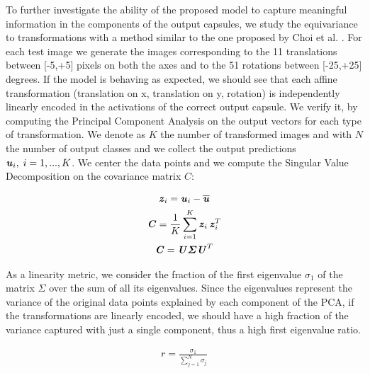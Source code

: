 \documentclass{article}
\begin{document}
To further investigate the ability of the proposed model to capture meaningful information in the components of the output capsules, we study the equivariance to transformations with a method similar to the one proposed by Choi et al. \cite{choi2019attention}. For each test image we generate the images corresponding to the 11 translations between [-5,+5] pixels on both the axes and to the 51 rotations between [-25,+25] degrees. If the model is behaving as expected, we should see that each affine transformation (translation on x, translation on y, rotation) is independently linearly encoded in the activations of the correct output capsule. We verify it, by computing the Principal Component Analysis on the output vectors for each type of transformation.  We denote as $K$ the number of transformed images and with $N$ the number of output classes and we collect the output predictions $\textbf{\textit{u}}_i,\;i=1,...,K$. We center the data points and we compute the Singular Value Decomposition on the covariance matrix $C$:

\begin{ceqn}
\begin{gather}
    \textbf{\textit{z}}_i = \textbf{\textit{u}}_i - \overline{\textbf{\textit{u}}} \\
    \textbf{\textit{C}} = \frac{1}{K}\sum_{i=1}^K\textbf{\textit{z}}_i\,\textbf{\textit{z}}_i^T \\
    \textbf{\textit{C}} = \textbf{\textit{U}}\bm{\varSigma}\textbf{\textit{U}}^T
    \label{eq:PCA}
\end{gather}
\end{ceqn}

As a linearity metric, we consider the fraction of the first eigenvalue $\sigma_1$ of the matrix $\bm{\varSigma}$ over the sum of all its eigenvalues. Since the eigenvalues represent the variance of the original data points explained by each component of the PCA, if the transformations are linearly encoded, we should have a high fraction of the variance captured with just a single component, thus a high first eigenvalue ratio.

\begin{ceqn}
\begin{gather}
    r = \frac{\sigma_1}{\sum_{j=1}^N \sigma_j}
    \label{eq:PCA_ratio}
\end{gather}
\end{ceqn}
\end{document}
